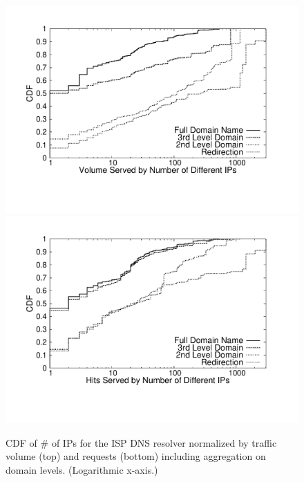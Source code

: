 \begin{figure}[htbp]
  \center
   \includegraphics[height=0.7\linewidth]{figures-pdf/14day-returnedIPCDF-bytes}
   \includegraphics[height=0.7\linewidth]{figures-pdf/14day-returnedIPCDF-hits}
  \caption{CDF of \# of IPs for the ISP DNS resolver normalized by traffic
    volume  (top) and requests (bottom) including aggregation on
    domain levels. (Logarithmic x-axis.)}
  \label{fig:CDF-IPPAF-IPs}
\end{figure}

